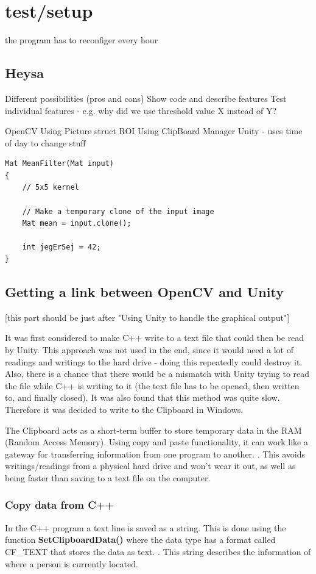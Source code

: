 \section{test/setup}
the program has to reconfiger every hour

\subsection{Heysa}
Different possibilities (pros and cons)
Show code and describe features
Test individual features - e.g. why did we use threshold value X instead of Y?

OpenCV
Using Picture struct
ROI
Using ClipBoard Manager
Unity - uses time of day to change stuff

\begin{lstlisting}
Mat MeanFilter(Mat input)
{
	// 5x5 kernel

	// Make a temporary clone of the input image
	Mat mean = input.clone();

	int jegErSej = 42;
}
\end{lstlisting}

\subsection{Getting a link between OpenCV and Unity}
[this part should be just after "Using Unity to handle the graphical output"]

It was first considered to make C++ write to a text file that could then be read by Unity. This approach was not used in the end, since it would need a lot of readings and writings to the hard drive - doing this repeatedly could destroy it. Also, there is a chance that there would be a mismatch with Unity trying to read the file while C++ is writing to it (the text file has to be opened, then written to, and finally closed). It was also found that this method was quite slow. Therefore it was decided to write to the Clipboard in Windows.

The Clipboard acts as a short-term buffer to store temporary data in the RAM (Random Access Memory). Using copy and paste functionality, it can work like a gateway for transferring information from one program to another. \citep{clipboard_one}. This avoids writings/readings from a physical hard drive and won't wear it out, as well as being faster than saving to a text file on the computer.

\subsubsection{Copy data from C++}
In the C++ program a text line is saved as a string. This is done using the function \textbf{SetClipboardData()} where the data type has a format called CF\_TEXT that stores the data as text.\citep{clipboard_two} \citep{clipboard_three}. This string describes the information of where a person is currently located.

